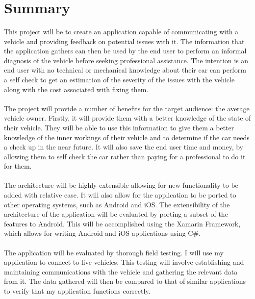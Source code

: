 \section{Summary}
	\paragraph{}{
	This project will be to create an application capable of communicating with a vehicle and providing feedback on potential issues with it. The information that the application gathers can then be used by the end user to perform an informal diagnosis of the vehicle before seeking professional assistance. The intention is an end user with no technical or mechanical knowledge about their car can perform a self check to get an estimation of the severity of the issues with the vehicle along with the cost associated with fixing them.
	}
	\paragraph{}{
	The project will provide a number of benefits for the target audience: the average vehicle owner. Firstly, it will provide them with a better knowledge of the state of their vehicle. They will be able to use this information to give them a better knowledge of the inner workings of their vehicle and to determine if the car needs a check up in the near future. It will also save the end user time and money, by allowing them to self check the car rather than paying for a professional to do it for them.
	}
	\paragraph{}
	{
	The architecture will be highly extensible allowing for new functionality to be added with relative ease. It will also allow for the application to be ported to other operating systems, such as Android and iOS. The extensibility of the architecture of the application will be evaluated by porting a subset of the features to Android. This will be accomplished using the Xamarin Framework, which allows for writing Android and iOS applications using C{\#}.
	}
	\paragraph{}
	{
	The application will be evaluated by thorough field testing. I will use my application to connect to live vehicles. This testing will involve establishing and maintaining communications with the vehicle and gathering the relevant data from it. The data gathered will then be compared to that of similar applications to verify that my application functions correctly.
	}
	
